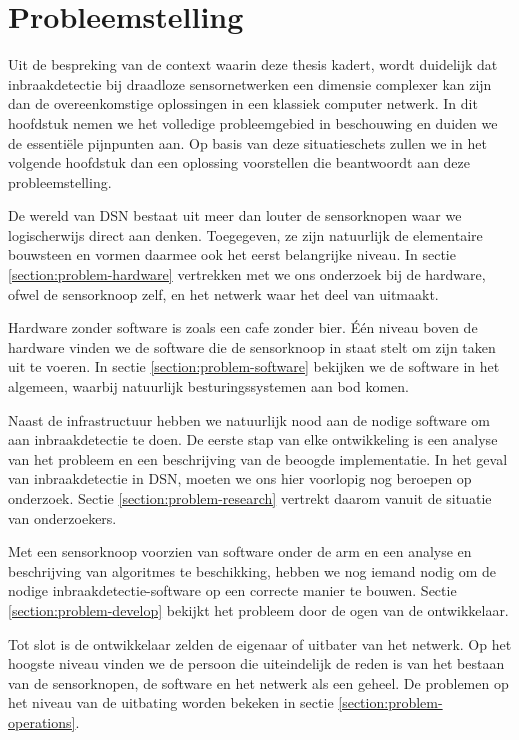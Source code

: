 
\chapter{Probleemstelling}
\label{chapter:probleemstelling}

Uit de bespreking van de context waarin deze thesis kadert, wordt duidelijk dat
inbraakdetectie bij draadloze sensornetwerken een dimensie complexer kan zijn
dan de overeenkomstige oplossingen in een klassiek computer netwerk. In dit
hoofdstuk nemen we het volledige probleemgebied in beschouwing en duiden we de
essenti\"ele pijnpunten aan. Op basis van deze situatieschets zullen we in het
volgende hoofdstuk dan een oplossing voorstellen die beantwoordt aan deze
probleemstelling.

De wereld van DSN bestaat uit meer dan louter de sensorknopen waar we
logischerwijs direct aan denken. Toegegeven, ze zijn natuurlijk de elementaire
bouwsteen en vormen daarmee ook het eerst belangrijke niveau. In sectie
\ref{section:problem-hardware} vertrekken met we ons onderzoek bij de hardware,
ofwel de sensorknoop zelf, en het netwerk waar het deel van uitmaakt.

Hardware zonder software is zoals een cafe zonder bier. \'E\'en niveau boven de
hardware vinden we de software die de sensorknoop in staat stelt om zijn taken
uit te voeren. In sectie \ref{section:problem-software} bekijken we de software
in het algemeen, waarbij natuurlijk besturingssystemen aan bod komen.

Naast de infrastructuur hebben we natuurlijk nood aan de nodige software om aan
inbraakdetectie te doen. De eerste stap van elke ontwikkeling is een analyse
van het probleem en een beschrijving van de beoogde implementatie. In het geval
van inbraakdetectie in DSN, moeten we ons hier voorlopig nog beroepen op
onderzoek. Sectie \ref{section:problem-research} vertrekt daarom vanuit de
situatie van onderzoekers.

Met een sensorknoop voorzien van software onder de arm en een analyse en
beschrijving van algoritmes te beschikking, hebben we nog iemand nodig om de
nodige inbraakdetectie-software op een correcte manier te bouwen. Sectie
\ref{section:problem-develop} bekijkt het probleem door de ogen van de
ontwikkelaar.

Tot slot is de ontwikkelaar zelden de eigenaar of uitbater van het netwerk. Op
het hoogste niveau vinden we de persoon die uiteindelijk de reden is van het
bestaan van de sensorknopen, de software en het netwerk als een geheel. De
problemen op het niveau van de uitbating worden bekeken in sectie
\ref{section:problem-operations}.


